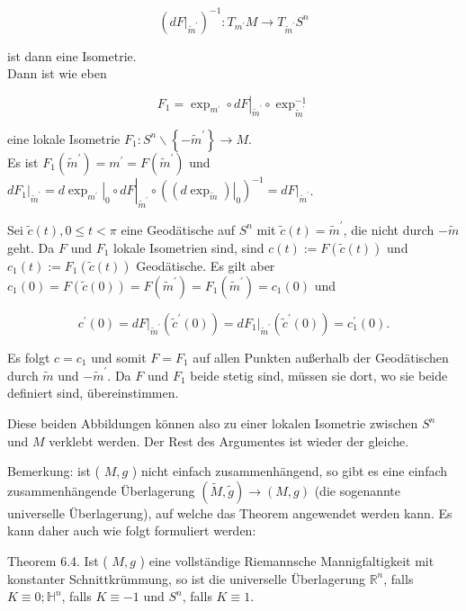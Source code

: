 \documentclass[10pt, letterpaper]{article}
\begin{document}
$$
\left(\left.d F\right|_{\tilde{m}^{\prime}}\right)^{-1}: T_{m^{\prime}} M \rightarrow T_{\tilde{m}^{\prime}} S^{n}
$$

ist dann eine Isometrie.\\
Dann ist wie eben

$$
F_{1}=\left.\exp _{m^{\prime}} \circ d F\right|_{\tilde{m}^{\prime}} \circ \exp _{\tilde{m}^{\prime}}^{-1}
$$

eine lokale Isometrie $F_{1}: S^{n} \backslash\left\{-\tilde{m}^{\prime}\right\} \rightarrow M$.\\
Es ist $F_{1}\left(\tilde{m}^{\prime}\right)=m^{\prime}=F\left(\tilde{m}^{\prime}\right)$ und $\left.d F_{1}\right|_{\tilde{m}^{\prime}}=\left.\left.d \exp _{m^{\prime}}\right|_{0} \circ d F\right|_{\tilde{m}^{\prime}} \circ\left(\left.\left(d \exp _{\tilde{m}}\right)\right|_{0}\right)^{-1}=\left.d F\right|_{\tilde{m}^{\prime}}$.

Sei $\tilde{c}(t), 0 \leq t<\pi$ eine Geodätische auf $S^{n}$ mit $\tilde{c}(t)=\tilde{m}^{\prime}$, die nicht durch $-\tilde{m}$ geht. Da $F$ und $F_{1}$ lokale Isometrien sind, sind $c(t):=F(\tilde{c}(t))$ und $c_{1}(t):=F_{1}(\tilde{c}(t))$ Geodätische. Es gilt aber $c_{1}(0)=F(\tilde{c}(0))=F\left(\tilde{m}^{\prime}\right)=F_{1}\left(\tilde{m}^{\prime}\right)=c_{1}(0)$ und

$$
c^{\prime}(0)=\left.d F\right|_{\tilde{m}^{\prime}}\left(\tilde{c}^{\prime}(0)\right)=\left.d F_{1}\right|_{\tilde{m}^{\prime}}\left(\tilde{c}^{\prime}(0)\right)=c_{1}^{\prime}(0) .
$$

Es folgt $c=c_{1}$ und somit $F=F_{1}$ auf allen Punkten außerhalb der Geodätischen durch $\tilde{m}$ und $-\tilde{m}^{\prime}$. Da $F$ und $F_{1}$ beide stetig sind, müssen sie dort, wo sie beide definiert sind, übereinstimmen.

Diese beiden Abbildungen können also zu einer lokalen Isometrie zwischen $S^{n}$ und $M$ verklebt werden. Der Rest des Argumentes ist wieder der gleiche.

Bemerkung: ist ( $M, g$ ) nicht einfach zusammenhängend, so gibt es eine einfach zusammenhängende Überlagerung $(\tilde{M}, \tilde{g}) \rightarrow(M, g)$ (die sogenannte universelle Überlagerung), auf welche das Theorem angewendet werden kann. Es kann daher auch wie folgt formuliert werden:

Theorem 6.4. Ist ( $M, g$ ) eine vollständige Riemannsche Mannigfaltigkeit mit konstanter Schnittkrümmung, so ist die universelle Überlagerung $\mathbb{R}^{n}$, falls $K \equiv 0 ; \mathbb{H}^{n}$, falls $K \equiv-1$ und $S^{n}$, falls $K \equiv 1$.
\end{document}
